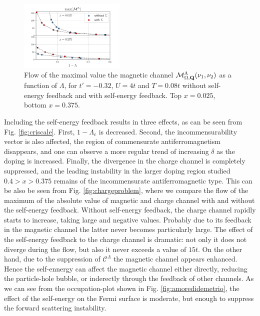 \begin{figure}
\includegraphics[width=0.45\textwidth]{images/chargeproblem_M_vs_Lambda_diff_occ.png}
\caption{Flow of the maximal value the magnetic channel $\mathcal{M}^\Lambda_{\Omega,\mathbf{Q}}(\nu_1,\nu_2)$ as a function of $\Lambda$, for $t'=-0.32$, $U=4t$ and $T=0.08t$ without self-energy feedback and with self-energy feedback. Top $x=0.025$, bottom $x=0.375$. }
\label{fig:selfeffect}
\end{figure}

Including the self-energy feedback results in three effects, as can be seen from Fig. \ref{fig:criscale}. 
First, $1-\Lambda_c$ is decreased.
Second, the incommensurability vector is also affected, the region of commensurate antiferromagnetism disappears, and one can observe a more regular trend of increasing $\delta$ as the doping is increased.
Finally, the divergence in the charge channel is completely suppressed, and the leading instability in the larger doping region studied  $0.4> x >0.375$ remains of the incommensurate antiferromagnetic type. 
This can be also be seen from Fig. \ref{fig:chargeproblem}, where we compare the flow of the maximum of the absolute value of magnetic and charge channel with and without the self-energy feedback. Without self-energy feedback, the charge channel rapidly starts to increase, taking large and negative values. Probably due to its feedback in the magnetic channel the latter never becomes particularly large.    
The effect of the self-energy feedback to the charge channel is dramatic: not only it does not diverge during the flow, but also it never exceeds a value of $15t$. 
On the other hand, due to the suppression of $\mathcal{C}^\Lambda$ the magnetic channel appears enhanced.
Hence the self-ennergy can affect the magnetic channel either directly, reducing the particle-hole bubble, or inderectly through the feedback of other channels.   
As we can see from the occupation-plot shown in Fig. \ref{fig:amoredidemetrio}, the effect of the self-energy on the Fermi surface is moderate, but enough to suppress the forward scattering instability. 

